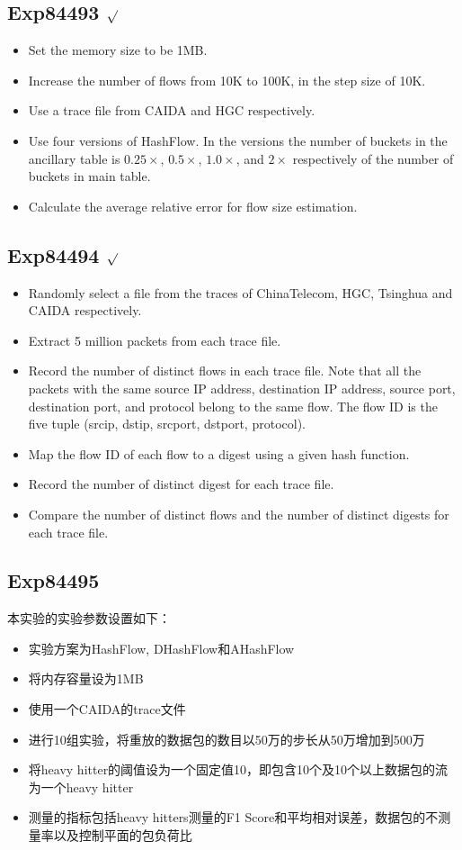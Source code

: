\documentclass{article}
\begin{document}
\subsection{Exp84493 $\surd$}
\begin{itemize}
	\item Set the memory size to be 1MB. 
	\item Increase the number of flows from 10K to 100K, in the step size of 10K.
	\item Use a trace file from CAIDA and HGC respectively.
	\item Use four versions of HashFlow. In the versions the number of buckets in the ancillary table is $0.25\times$, $0.5\times$, $1.0\times$, and $2\times$ respectively of the number of buckets in main table.
	\item Calculate the average relative error for flow size estimation.
\end{itemize}

\subsection{Exp84494 $\surd$}
\begin{itemize}
	\item Randomly select a file from the traces of ChinaTelecom, HGC, Tsinghua and CAIDA respectively. 
	\item Extract 5 million packets from each trace file.
	\item Record the number of distinct flows in each trace file. Note that all the packets with the same source IP address, destination IP address, source port, destination port, and protocol belong to the same flow. The flow ID is the five tuple (srcip, dstip, srcport, dstport, protocol).
	\item Map the flow ID of each flow to a digest using a given hash function.
	\item Record the number of distinct digest for each trace file. 
	\item Compare the number of distinct flows and the number of distinct digests for each trace file.
\end{itemize}

\subsection{Exp84495}
本实验的实验参数设置如下：
\begin{itemize}
\item 实验方案为HashFlow, DHashFlow和AHashFlow
\item 将内存容量设为1MB
\item 使用一个CAIDA的trace文件
\item 进行10组实验，将重放的数据包的数目以50万的步长从50万增加到500万
\item 将heavy hitter的阈值设为一个固定值10，即包含10个及10个以上数据包的流为一个heavy hitter
\item 测量的指标包括heavy hitters测量的F1 Score和平均相对误差，数据包的不测量率以及控制平面的包负荷比
\end{itemize}
\end{document}
